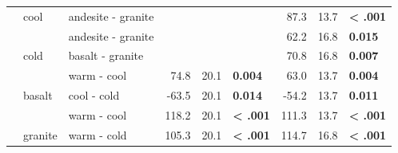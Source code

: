 \documentclass[english,man,floatsintext]{apa6}
\begin{document}
\begin{longtable}[t]{rllrrlrrl}
 & \multirow[t]{-2}{*}{\raggedright\arraybackslash cool} & andesite - granite &  &  &  & 87.3 & 13.7 & \textbf{< .001}\\
\nopagebreak
 &  & andesite - granite &  &  &  & 62.2 & 16.8 & \textbf{0.015}\\
\nopagebreak
 & \multirow[t]{-2}{*}{\raggedright\arraybackslash cold} & basalt - granite &  &  &  & 70.8 & 16.8 & \textbf{0.007}\\
\nopagebreak
 &  & warm - cool & 74.8 & 20.1 & \textbf{0.004} & 63.0 & 13.7 & \textbf{0.004}\\
\nopagebreak
 & \multirow[t]{-2}{*}{\raggedright\arraybackslash basalt} & cool - cold & -63.5 & 20.1 & \textbf{0.014} & -54.2 & 13.7 & \textbf{0.011}\\
\nopagebreak
 &  & warm - cool & 118.2 & 20.1 & \textbf{< .001} & 111.3 & 13.7 & \textbf{< .001}\\
\nopagebreak
\multirow[t]{-11}{*}{\raggedleft\arraybackslash 2019} & \multirow[t]{-2}{*}{\raggedright\arraybackslash granite} & warm - cold & 105.3 & 20.1 & \textbf{< .001} & 114.7 & 16.8 & \textbf{< .001}\\
\bottomrule
\end{longtable}
\endgroup{}



\begingroup\fontsize{10}{12}\selectfont
\end{document}
